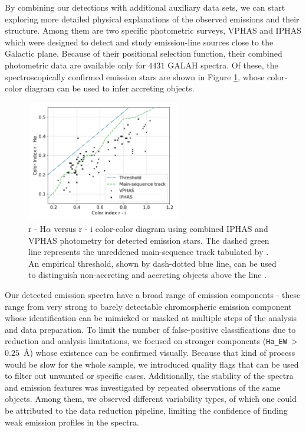 By combining our detections with additional auxiliary data sets, we can start exploring more detailed physical explanations of the observed emissions and their structure. Among them are two specific photometric surveys, VPHAS \cite{2014MNRAS.440.2036D} and IPHAS \cite{2008MNRAS.384.1277W} which were designed to detect and study emission-line sources close to the Galactic plane. Because of their positional selection function, their combined photometric data are available only for $4431$ GALAH spectra. Of these, the spectroscopically confirmed emission stars are shown in Figure \ref{fig:iphas_vphas}, whose color-color diagram can be used to infer accreting objects.


\begin{figure}
	\centering
	\includegraphics[width=0.6\textwidth]{mag_iphas_vphas_sep.png}
	\caption{r - H$\alpha$ versus r - i color-color diagram using combined IPHAS and VPHAS photometry for detected emission stars. The dashed green line represents the unreddened main-sequence track tabulated by \citet{2014MNRAS.440.2036D}. An empirical threshold, shown by dash-dotted blue line, can be used to distinguish non-accreting and accreting objects above the line \cite{2018A&A...609A..10V}.}
	\label{fig:iphas_vphas}
\end{figure}

Our detected emission spectra have a broad range of emission components - these range from very strong to barely detectable chromospheric emission component whose identification can be mimicked or masked at multiple steps of the analysis and data preparation. To limit the number of false-positive classifications due to reduction and analysis limitations, we focused on stronger components (\texttt{Ha\_EW}~>~$0.25$~\AA) whose existence can be confirmed visually. Because that kind of process would be slow for the whole sample, we introduced quality flags that can be used to filter out unwanted or specific cases. Additionally, the stability of the spectra and emission features was investigated by repeated observations of the same objects. Among them, we observed different variability types, of which one could be attributed to the data reduction pipeline, limiting the confidence of finding weak emission profiles in the spectra.


